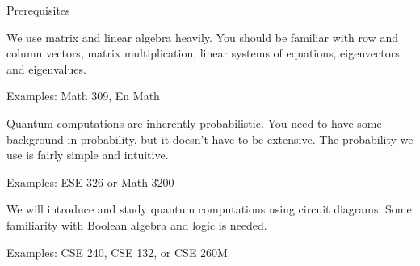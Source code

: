 \begin{frame}{Prerequisites}
\begin{description}[<+->]
    \item[Matrix math]  We use matrix and linear algebra heavily.  You should be familiar with row and column vectors, matrix multiplication, linear systems of equations, eigenvectors and eigenvalues.
    
    Examples:  Math 309, En Math
    \item[Probability] Quantum computations are inherently probabilistic.  You need to have some background in probability, but it doesn't have to be extensive.  The probability we use is fairly simple and intuitive.
    
    Examples:  ESE 326 or Math 3200
    \item[Circuits]  We will introduce and study quantum computations using circuit diagrams.    Some familiarity with Boolean algebra and logic is needed.
    
    Examples:  CSE 240, CSE 132, or CSE 260M
\end{description}
\end{frame}

